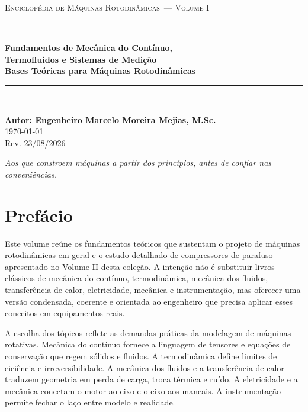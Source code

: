 \documentclass[12pt,a4paper]{article}
\numberwithin{equation}{section}
\numberwithin{table}{section}
\numberwithin{figure}{section}
\newcommand{\colecaotitulo}{Enciclopédia de Máquinas Rotodinâmicas}
\newcommand{\volumeatual}{Volume I}
\newcommand{\revdata}{Rev. 23/08/2026}
\begin{document}
	\begin{titlepage}
		\centering
		\vspace*{1.5cm}
		{\large \textsc{\colecaotitulo\ --- \volumeatual}} \\[1cm]
		\rule{\textwidth}{0.4pt} \\[0.8cm]
		{\Huge \textbf{Fundamentos de Mecânica do Contínuo,}} \\[0.3cm]
		{\Huge \textbf{Termofluidos e Sistemas de Medição}} \\[0.5cm]
		{\Large \textbf{Bases Teóricas para Máquinas Rotodinâmicas}} \\[0.8cm]
		\rule{\textwidth}{0.4pt} \\[1.5cm]

		\vspace{5cm}

		\vfill
		{\large \textbf{Autor: Engenheiro Marcelo Moreira Mejias, M.Sc.}} \\[0.5cm]

		{\large \today} \\[0.3cm]
		{\normalsize \revdata}
	\end{titlepage}

	\newpage
	\thispagestyle{empty}
	\vspace*{\fill}
	\begin{flushright}
		\textit{Aos que constroem máquinas a partir dos princípios,}
		\textit{antes de confiar nas conveniências.}
	\end{flushright}
	\vspace*{\fill}


\newpage
\section*{Prefácio}

Este volume reúne os fundamentos teóricos que sustentam o projeto de máquinas
rotodinâmicas em geral e o estudo detalhado de compressores de parafuso
apresentado no Volume II desta coleção. A intenção não é substituir livros
clássicos de mecânica do contínuo, termodinâmica, mecânica dos fluidos,
transferência de calor, eletricidade, mecânica e instrumentação, mas oferecer
uma versão condensada, coerente e orientada ao engenheiro que precisa aplicar
esses conceitos em equipamentos reais.

A escolha dos tópicos reflete as demandas práticas da modelagem de máquinas
rotativas. Mecânica do contínuo fornece a linguagem de tensores e equações de
conservação que regem sólidos e fluidos. A termodinâmica define limites de
eiciência e irreversibilidade. A mecânica dos fluidos e a transferência de
calor traduzem geometria em perda de carga, troca térmica e ruído. A eletricidade
 e a mecânica conectam o motor ao eixo e o eixo aos mancais. A instrumentação
 permite fechar o laço entre modelo e realidade.
\end{document}
